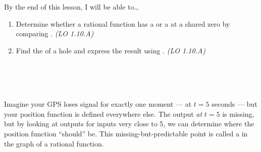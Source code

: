 \documentclass[10pt]{article}
\begin{document}
\namedateperiod

\vspace{0.1in}

\begin{objectivebox}
By the end of this lesson, I will be able to\ldots
\begin{enumerate}[itemsep=2pt]
  \item Determine whether a rational function has a  or a 
        at a shared zero by comparing . \hfill\textit{(LO 1.10.A)}
  \item Find the  of a hole and express the result using
        . \hfill\textit{(LO 1.10.A)}
\end{enumerate}
\end{objectivebox}

\vspace{0.08in}

\begin{vocabbox}
 \\[2pt]
 \\[2pt]
 \\[2pt]
 
\end{vocabbox}

\vspace{0.08in}

\begin{hookbox}
Imagine your GPS loses signal for exactly one moment --- at $t = 5$ seconds --- but your
position function is defined everywhere else. The output \textit{at} $t = 5$ is missing,
but by looking at outputs for inputs very close to 5, we can determine where the position
function ``should'' be. This missing-but-predictable point is called a  in
the graph of a rational function.
\end{hookbox}

\vspace{0.08in}
\end{document}
